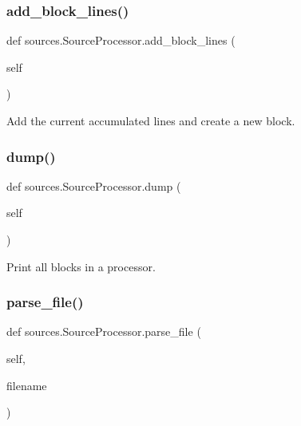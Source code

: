 \subsubsection{\texorpdfstring{add\+\_\+block\+\_\+lines()}{add\_block\_lines()}}
{\footnotesize\ttfamily def sources.\+Source\+Processor.\+add\+\_\+block\+\_\+lines (\begin{DoxyParamCaption}\item[{}]{self }\end{DoxyParamCaption})}

\begin{DoxyVerb}Add the current accumulated lines and create a new block.\end{DoxyVerb}
 \mbox{\label{classsources_1_1_source_processor_a4b76f5fe5374cca4929e6d4fb6eb0e1f}} 
\subsubsection{\texorpdfstring{dump()}{dump()}}
{\footnotesize\ttfamily def sources.\+Source\+Processor.\+dump (\begin{DoxyParamCaption}\item[{}]{self }\end{DoxyParamCaption})}

\begin{DoxyVerb}Print all blocks in a processor.\end{DoxyVerb}
 \mbox{\label{classsources_1_1_source_processor_ac3aa49eda144c4b855c84907d8f95c18}} 
\subsubsection{\texorpdfstring{parse\+\_\+file()}{parse\_file()}}
{\footnotesize\ttfamily def sources.\+Source\+Processor.\+parse\+\_\+file (\begin{DoxyParamCaption}\item[{}]{self,  }\item[{}]{filename }\end{DoxyParamCaption})}

